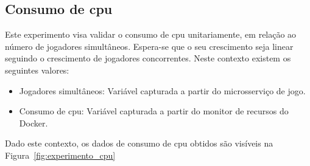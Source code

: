 \subsection{Consumo de \ac{cpu}}

Este experimento visa validar o consumo de \ac{cpu} unitariamente, em relação ao número de jogadores simultâneos.
%
Espera-se que o seu crescimento seja linear seguindo o crescimento de jogadores concorrentes.
%
Neste contexto existem os seguintes valores:

\begin{itemize}
    \item Jogadores simultâneos: Variável capturada a partir do microsserviço de jogo.
    \item Consumo de \ac{cpu}: Variável capturada a partir do monitor de recursos do Docker.
\end{itemize}

Dado este contexto, os dados de consumo de \ac{cpu} obtidos são visíveis na Figura~\ref{fig:experimento_cpu}

